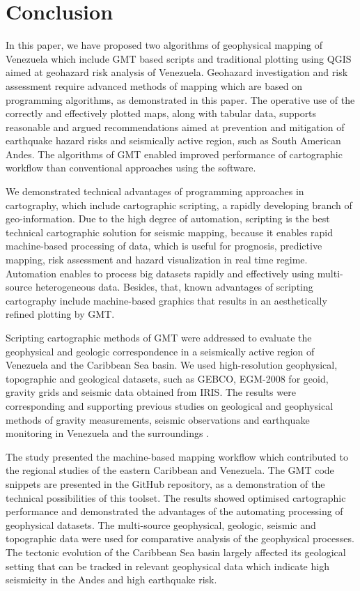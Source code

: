 \documentclass[sustainability,article,submit,pdftex,moreauthors]{Definitions/mdpi}
\begin{document}
\section{Conclusion}

In this paper, we have proposed two algorithms of geophysical mapping of Venezuela which include GMT based scripts and traditional plotting using QGIS aimed at geohazard risk analysis of Venezuela. Geohazard investigation and risk assessment require advanced methods of mapping which are based on programming algorithms, as demonstrated in this paper. The operative use of the correctly and effectively plotted maps, along with tabular data, supports reasonable and argued recommendations aimed at prevention and mitigation of earthquake hazard risks and seismically active region, such as South American Andes. The algorithms of GMT enabled improved performance of cartographic workflow than conventional approaches using the software. 

We demonstrated technical advantages of programming approaches in cartography, which include cartographic scripting, a rapidly developing branch of geo-information. Due to the high degree of automation, scripting is the best technical cartographic solution for seismic mapping, because it enables rapid machine-based processing of data, which is useful for prognosis, predictive mapping, risk assessment and hazard visualization in real time regime. Automation enables to process big datasets rapidly and effectively using multi-source heterogeneous data. Besides, that, known advantages of scripting cartography include machine-based graphics that results in an aesthetically refined plotting by GMT. 

Scripting cartographic methods of GMT were addressed to evaluate the geophysical and geologic correspondence in a seismically active region of Venezuela and the Caribbean Sea basin. We used high-resolution geophysical, topographic and geological datasets, such as GEBCO, EGM-2008 for geoid, gravity grids and seismic data obtained from IRIS. The results were corresponding and supporting previous studies on geological and geophysical methods of gravity measurements, seismic observations and earthquake monitoring in Venezuela and the surroundings \citep{Guenther,Schmitz2008}.  

The study presented the machine-based mapping workflow which contributed to the regional studies of the eastern Caribbean and Venezuela. The GMT code snippets are presented in the GitHub repository, as a demonstration of the technical possibilities of this toolset. The results showed optimised cartographic performance and demonstrated the advantages of the automating processing of geophysical datasets. The multi-source geophysical, geologic, seismic and topographic data were used for comparative analysis of the geophysical processes. The tectonic evolution of the Caribbean Sea basin largely affected its geological setting that can be tracked in relevant geophysical data which indicate high seismicity in the Andes and high earthquake risk.
\end{document}

